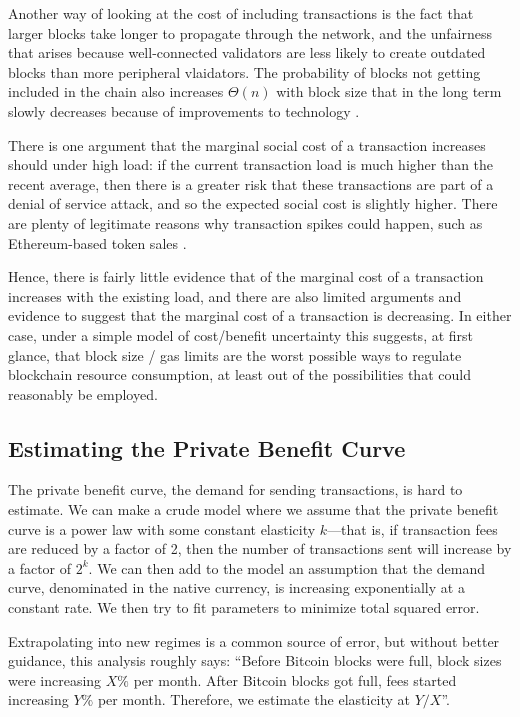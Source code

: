 \documentclass[12pt, final]{article}
\begin{document}
Another way of looking at the cost of including transactions is the fact that larger blocks take longer to propagate through the network, and the unfairness that arises because well-connected validators are less likely to create outdated blocks than more peripheral vlaidators. The probability of blocks not getting included in the chain also increases $\Theta(n)$ with block size that in the long term slowly decreases because of improvements to technology \cite{vitalik-uncle-rate}.

There is one argument that the marginal social cost of a transaction increases should under high load: if the current transaction load is much higher than the recent average, then there is a greater risk that these transactions are part of a denial of service attack, and so the expected social cost is slightly higher.  There are plenty of legitimate reasons why transaction spikes could happen, such as Ethereum-based token sales \cite{medium-codetract}.

Hence, there is fairly little evidence that of the marginal cost of a transaction increases with the existing load, and there are also limited arguments and evidence to suggest that the marginal cost of a transaction is decreasing. In either case, under a simple model of cost/benefit uncertainty this suggests, at first glance, that block size / gas limits are the worst possible ways to regulate blockchain resource consumption, at least out of the possibilities that could reasonably be employed. 

\subsection{Estimating the Private Benefit Curve} 

The private benefit curve, the demand for sending transactions, is hard to estimate. We can make a crude model where we assume that the private benefit curve is a power law with some constant elasticity $k$---that is, if transaction fees are reduced by a factor of 2, then the number of transactions sent will increase by a factor of $2^k$. We can then add to the model an assumption that the demand curve, denominated in the native currency, is increasing exponentially at a constant rate. We then try to fit parameters to minimize total squared error. 

Extrapolating into new regimes is a common source of error, but without better guidance, this analysis roughly says: ``Before Bitcoin blocks were full, block sizes were increasing $X\%$ per month. After Bitcoin blocks got full, fees started increasing $Y\%$ per month. Therefore, we estimate the elasticity at $Y / X$''. 
\end{document}
